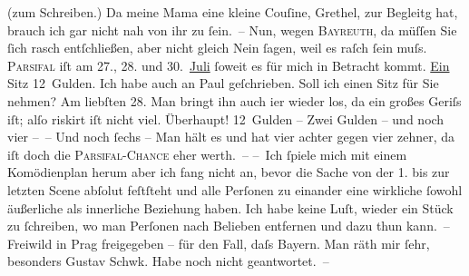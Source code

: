 \begin{ledgroupsized}[t]{13cm}
               (zum Schreiben.) Da meine Mama eine kleine Couſine, Grethel,
               zur Begleitg hat, brauch ich gar nicht nah von ihr zu ſein. –\pend
           \pstart
           Nun, wegen \textsc{Bayreuth}, da müſſen Sie ſich rasch {\pb}entſchließen, aber
               nicht gleich Nein ſagen, weil es raſch ſein muſs. \textsc{Parsifal} iſt am 27., 28. und 30. \uline{Juli}{ }ſoweit es für mich in Betracht kommt. \uline{Ein}{ }Sitz 12 Gulden. Ich habe auch an Paul geſchrieben. Soll ich ei{\pb}nen Sitz für Sie nehmen? Am liebſten 28.
               Man bringt ihn auch i{\geminationm}er wieder los, da ein großes
               Geriſs iſt; alſo riskirt iſt nicht viel. Überhaupt! 12 Gulden – Zwei Gulden – und
               noch vier – – Und noch ſechs – Man {\pb}hält es und hat
               vier achter gegen vier zehner, da iſt doch die \textsc{Parsifal-Chance} eher werth. –\pend
           \pstart
           – Ich ſpiele mich mit einem Komödienplan herum {\dotsfour} aber ich fang nicht an,
               bevor die Sache von der 1. bis zur letzten Scene abſolut feſtſteht und alle {\pb}Perſonen zu einander eine wirkliche ſowohl äußerliche
               als innerliche Beziehung haben. Ich habe keine Luſt, wieder ein Stück zu ſchreiben,
               wo man Perſonen nach Belieben entfernen und dazu thun kann. – Freiwild in Prag frei{\pb}gegeben – für den Fall, daſs Bayern. Man räth mir ſehr, besonders Gustav Schwk. Habe noch nicht geantwortet. –\pend

\end{ledgroupsized}

